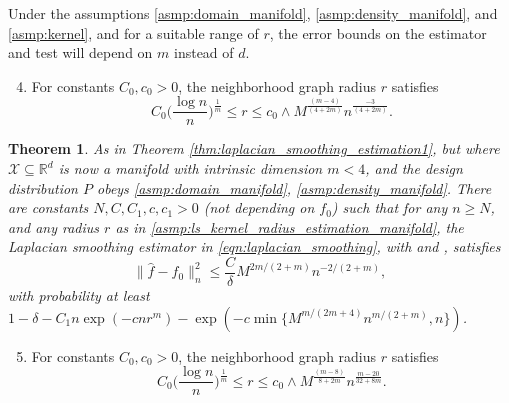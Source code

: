 \documentclass[twoside]{article}
\newcommand{\Reals}{\mathbb{R}}
\newcommand{\1}{\mathbf{1}}
\newcommand{\Rd}{\Reals^d}
\newcommand{\Xset}{\mathcal{X}}
\newcommand{\wh}[1]{\widehat{#1}}
\newtheorem{theorem}{Theorem}
\theoremstyle{definition}
\theoremstyle{remark}
\begin{document}
Under the assumptions \ref{asmp:domain_manifold}, \ref{asmp:density_manifold}, and \ref{asmp:kernel}, and for a suitable range of $r$, the error bounds on the estimator \smash{$\wh{f}$} and test \smash{$\wh{\varphi}$} will depend on $m$ instead of $d$. 
\begin{enumerate}[label=(R\arabic*)]
	\setcounter{enumi}{3}
	\item 
	\label{asmp:ls_kernel_radius_estimation_manifold}
	For constants $C_0,c_0>0$, the neighborhood graph radius $r$ satisfies 
	\begin{equation*}
	C_0\biggl(\frac{\log n}{n}\biggr)^{\frac{1}{m}} \leq r \leq c_0 \wedge  M^{\frac{(m - 4)}{(4 + 2m)}} n^{\frac{-3}{(4 + 2m)}}.
	\end{equation*}
\end{enumerate}

\begin{theorem}
	\label{thm:laplacian_smoothing_estimation_manifold}
  As in Theorem \ref{thm:laplacian_smoothing_estimation1}, but where $\Xset \subseteq \Rd$ is now a manifold with intrinsic dimension $m < 4$, and the design distribution $P$ obeys \ref{asmp:domain_manifold}, \ref{asmp:density_manifold}. There are constants $N,C,C_1,c,c_1>0$ (not depending on $f_0$) such that for any $n \geq N$, and any radius $r$ as in \ref{asmp:ls_kernel_radius_estimation_manifold}, the Laplacian smoothing estimator \smash{$\wh{f}$} in \eqref{eqn:laplacian_smoothing}, with  and , satisfies
	\begin{equation*}
	\bigl\|\wh{f} - f_0\bigr\|_n^2 \leq \frac{C}{\delta} M^{2m/(2 + m)} n^{-2/(2 + m)},
	\end{equation*}
  with probability at least $1 - \delta -  C_1 n\exp(-cnr^m) - \exp(-c \min\{M^{m/(2m + 4)} n^{m/(2+m)},n\})$.
\end{theorem}

\begin{enumerate}[label=(R\arabic*)]
	\setcounter{enumi}{4}
	\item 
	\label{asmp:ls_kernel_radius_testing_manifold}
	For constants $C_0,c_0>0$, the neighborhood graph radius $r$ satisfies 
	\begin{equation*}
	C_0\biggl(\frac{\log n}{n}\biggr)^{\frac{1}{m}} \leq r \leq c_0 \wedge M^{\frac{(m - 8)}{8 + 2m}} n^{\frac{m - 20}{32 + 8m}}.
	\end{equation*}
\end{enumerate}
\end{document}
